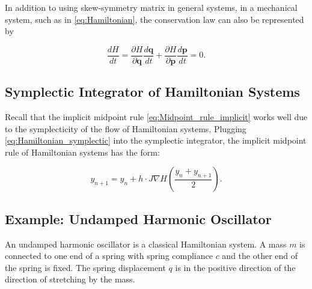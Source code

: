 \documentclass[
	parskip, 			   %
	twoside, 			   %
	DIV=14, 			   %
	BCOR=15.0mm, 		   %
	headsepline, 		   %
	open=right, 		   %
	captions=tableheading, %
	bibliography=totoc,    %
	numbers=noenddot       %
]{scrreprt}
\begin{document}
In addition to using skew-symmetry matrix in general systems, in a mechanical system, such as in \ref{eq:Hamiltonian}, the conservation law can also be represented by

\begin{equation}
    \label{eq:Hamiltonian_invariant_in_mechaniacal_system}
    \frac{dH}{dt} = \frac{\partial H}{\partial \mathbf{q}} \frac{d \mathbf{q}}{dt} + \frac{\partial H}{\partial \mathbf{p}} \frac{d \mathbf{p}}{dt} = 0.
\end{equation}

\subsection{Symplectic Integrator of Hamiltonian Systems}
Recall that the implicit midpoint rule \ref{eq:Midpoint_rule_implicit} works well due to the symplecticity of the flow of Hamiltonian systems. Plugging \ref{eq:Hamiltonian_symplectic} into the symplectic integrator, the implicit midpoint rule of Hamiltonian systems has the form:

\begin{equation}
    \label{eq:Midpoint_rule_implicit_Hamiltonian}
    y_{n+1} = y_{n} + h \cdot J \nabla H (\frac{y_{n} + y_{n+1}}{2}).
\end{equation}

\subsection{Example: Undamped Harmonic Oscillator}
An undamped harmonic oscillator is a classical Hamiltonian system. A mass $m$ is connected to one end of a spring with spring compliance $c$ and the other end of the spring is fixed. The spring displacement $q$ is in the positive direction of the direction of stretching by the mass.
\end{document}
